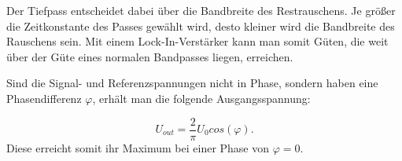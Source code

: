 \noindent Der Tiefpass entscheidet dabei über die Bandbreite des Restrauschens. 
Je größer die Zeitkonstante des Passes gewählt wird, desto kleiner wird die Bandbreite 
des Rauschens sein. Mit einem Lock-In-Verstärker kann man somit Güten, 
die weit über der Güte eines normalen Bandpasses liegen, erreichen.

\noindent Sind die Signal- und Referenzspannungen nicht in Phase, sondern haben eine 
Phasendifferenz $\varphi$, erhält man die folgende Ausgangsspannung: 

\begin{equation}
    U_{out} = \frac{2}{\pi} U_0 cos(\varphi). %
    \label{eqn:u_out}
\end{equation}
Diese erreicht somit ihr Maximum bei einer Phase von $\varphi = 0$. 
